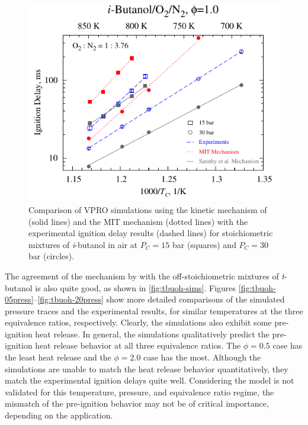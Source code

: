 \documentclass[12pt, letterpaper]{article}
\begin{document}
\begin{figure}
    \centering
    \includegraphics[width=12cm]{03-Butanol/buoh-mit}
    \caption{Comparison of VPRO simulations using the kinetic mechanism of 
        \textcite{Sarathy2012} (solid lines) and the MIT mechanism 
        \cite{Hansen2013,Merchant2013} (dotted lines) with the experimental 
        ignition delay results (dashed lines) for stoichiometric mixtures of
        \textit{i}-butanol in air at $P_C=15$ bar (squares) and $P_C=30$ bar
        (circles).}
    \label{fig:buoh-mit}
\end{figure}

The agreement of the mechanism by \textcite{Sarathy2012} with the
off-stoichiometric mixtures of \textit{t}-butanol is also quite good, as shown
in \autoref{fig:tbuoh-sims}. Figures
\ref{fig:tbuoh-05press}--\ref{fig:tbuoh-20press} show more detailed comparisons
of the simulated pressure traces and the experimental results, for similar
temperatures at the three equivalence ratios, respectively. Clearly, the
simulations also exhibit some pre-ignition heat release. In general, the
simulations qualitatively predict the pre-ignition heat release behavior at all
three equivalence ratios. The $\phi=0.5$ case has the least heat release and
the $\phi=2.0$ case has the most. Although the simulations are unable to match
the heat release behavior quantitatively, they match the experimental ignition
delays quite well. Considering the model is not validated for this temperature,
pressure, and equivalence ratio regime, the mismatch of the pre-ignition
behavior may not be of critical importance, depending on the application.
\end{document}

